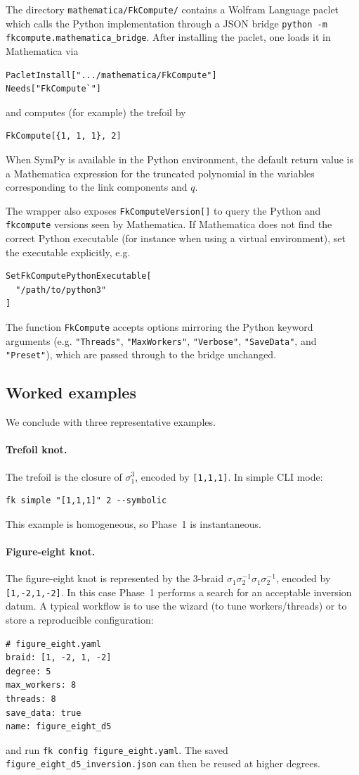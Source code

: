 \documentclass[twocolumn]{article}
\begin{document}
The directory \texttt{mathematica/FkCompute/} contains a Wolfram Language paclet
which calls the Python implementation through a JSON bridge
\texttt{python -m fkcompute.mathematica\_bridge}.  After installing the paclet,
one loads it in Mathematica via
\begin{verbatim}
PacletInstall[".../mathematica/FkCompute"]
Needs["FkCompute`"]
\end{verbatim}
and computes (for example) the trefoil by
\begin{verbatim}
FkCompute[{1, 1, 1}, 2]
\end{verbatim}
When SymPy is available in the Python environment, the default return value is
a Mathematica expression for the truncated polynomial in the variables
corresponding to the link components and $q$.

The wrapper also exposes \texttt{FkComputeVersion[]} to query the Python and
\texttt{fkcompute} versions seen by Mathematica.  If Mathematica does not find
the correct Python executable (for instance when using a virtual environment),
set the executable explicitly, e.g.
\begin{verbatim}
SetFkComputePythonExecutable[
  "/path/to/python3"
]
\end{verbatim}

The function \texttt{FkCompute} accepts options mirroring the Python keyword
arguments (e.g. \texttt{"Threads"}, \texttt{"MaxWorkers"}, \texttt{"Verbose"},
\texttt{"SaveData"}, and \texttt{"Preset"}), which are passed through to the
bridge unchanged.

\subsection{Worked examples}

We conclude with three representative examples.

\paragraph{Trefoil knot.}
The trefoil is the closure of $\sigma_1^3$, encoded by \texttt{[1,1,1]}.
In simple CLI mode:
\begin{verbatim}
fk simple "[1,1,1]" 2 --symbolic
\end{verbatim}
This example is homogeneous, so Phase~1 is instantaneous.

\paragraph{Figure-eight knot.}
The figure-eight knot is represented by the 3-braid
$\sigma_1\sigma_2^{-1}\sigma_1\sigma_2^{-1}$, encoded by \texttt{[1,-2,1,-2]}.
In this case Phase~1 performs a search for an acceptable inversion datum.
A typical workflow is to use the wizard (to tune workers/threads) or to store a
reproducible configuration:
\begin{verbatim}
# figure_eight.yaml
braid: [1, -2, 1, -2]
degree: 5
max_workers: 8
threads: 8
save_data: true
name: figure_eight_d5
\end{verbatim}
and run \texttt{fk config figure\_eight.yaml}.  The saved
\texttt{figure\_eight\_d5\_inversion.json} can then be reused at higher degrees.
\end{document}
